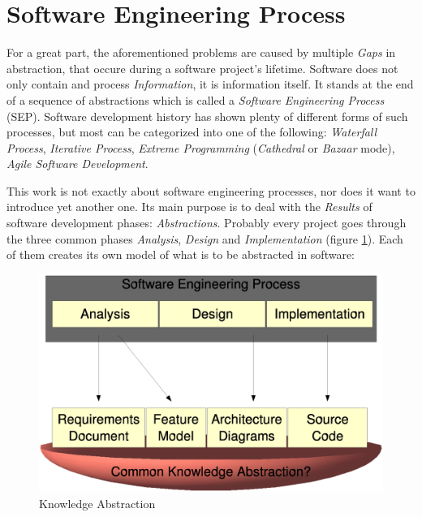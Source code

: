 %
%
%
%
%
%
%

\section{Software Engineering Process}
\label{software_engineering_process_heading}

For a great part, the aforementioned problems are caused by multiple \emph{Gaps}
in abstraction, that occure during a software project's lifetime. Software does
not only contain and process \emph{Information}, it is information itself.
It stands at the end of a sequence of abstractions which is called a
\emph{Software Engineering Process} (SEP). Software development history has shown
plenty of different forms of such processes, but most can be categorized into one
of the following: \emph{Waterfall Process}, \emph{Iterative Process},
\emph{Extreme Programming} (\emph{Cathedral} or \emph{Bazaar} mode),
\emph{Agile Software Development}.

This work is not exactly about software engineering processes, nor does it want
to introduce yet another one. Its main purpose is to deal with the \emph{Results}
of software development phases: \emph{Abstractions}. Probably every project goes
through the three common phases \emph{Analysis}, \emph{Design} and
\emph{Implementation} (figure \ref{knowledge_abstraction_figure}). Each of them
creates its own model of what is to be abstracted in software:

\begin{figure}[ht]
    \begin{center}
        \includegraphics[scale=0.3]{vector/knowledge_abstraction.eps}
        \caption{Knowledge Abstraction}
        \label{knowledge_abstraction_figure}
    \end{center}
\end{figure}

